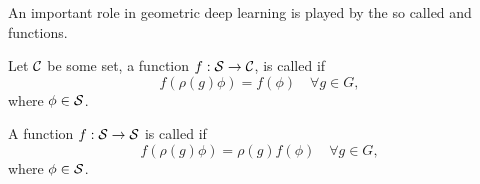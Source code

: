 \documentclass[../3.tex]{subfiles}
\begin{document}
    An important role in geometric deep learning is played by the so called  and  functions.

    \begin{defn}
        Let $\mathcal{C}$ be some set, a function $f : \mathcal{S} \to \mathcal{C}$, is called  if
        \[ f(\rho(g)\phi) = f(\phi) \quad \forall g \in G, \]
        where $\phi \in \mathcal{S}$.
   \end{defn}

   \begin{defn}
       A function $f : \mathcal{S} \to \mathcal{S}$ is called  if 
       \[ f(\rho(g)\phi) = \rho(g)f(\phi) \quad \forall g \in G, \]
       where $\phi \in \mathcal{S}$.
   \end{defn}
\end{document}
